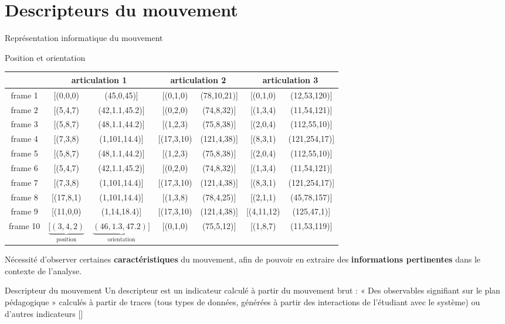 \documentclass[svgnames]{beamer}
\newcommand{\mycite}[1]{[\textit{\cite{#1}}]}
\begin{document}
	\section{Descripteurs du mouvement}
	\begin{frame}{Représentation informatique du mouvement}
		\begin{center}Position et orientation\end{center}
        \begin{table}
			\begin{adjustbox}{max width=\textwidth}
				\begin{tabular}{c|cccccc}
        		& \multicolumn{2}{c}{articulation 1}  & \multicolumn{2}{c}{articulation 2} & \multicolumn{2}{c}{articulation 3}\\\hline
        		frame 1 & [(0,0,0) & (45,0,45)]     & [(0,1,0)  & (78,10,21)]   & [(0,1,0) & (12,53,120)]\\
        		frame 2 & [(5,4,7) & (42,1.1,45.2)] & [(0,2,0)  & (74,8,32)]    & [(1,3,4) & (11,54,121)]\\
        		frame 3 & [(5,8,7) & (48,1.1,44.2)] & [(1,2,3)  & (75,8,38)]    & [(2,0,4) & (112,55,10)]\\
        		frame 4 & [(7,3,8) & (1,101,14.4)]  & [(17,3,10)  & (121,4,38)]    & [(8,3,1) & (121,254,17)]\\
        		frame 5 & [(5,8,7) & (48,1.1,44.2)] & [(1,2,3)  & (75,8,38)]    & [(2,0,4) & (112,55,10)]\\
        		frame 6 & [(5,4,7) & (42,1.1,45.2)] & [(0,2,0)  & (74,8,32)]    & [(1,3,4) & (11,54,121)]\\
        		frame 7 & [(7,3,8) & (1,101,14.4)]  & [(17,3,10)  & (121,4,38)]    & [(8,3,1) & (121,254,17)]\\
        		frame 8 & [(17,8,1) & (1,101,14.4)]  & [(1,3,8)  & (78,4,25)]    & [(2,1,1) & (45,78,157)]\\
        		frame 9 & [(11,0,0) & (1,14,18.4)]  & [(17,3,10)  & (121,4,38)]    & [(4,11,12) & (125,47,1)]\\
        		frame 10 & $\underbrace{[(3,4,2)}_\text{position}$ & $\underbrace{(46,1.3,47.2)]}_\text{orientation}$ & [(0,1,0) & (75,5,12)] & [(1,8,7) & (11,53,119)]\\
        		\end{tabular}
        	\end{adjustbox}
        \end{table}
	\end{frame}
	
	\begin{frame}{\secname}
		Nécessité d'observer certaines \textbf{caractéristiques} du mouvement, afin de pouvoir en extraire des \textbf{informations pertinentes} dans le contexte de l'analyse.
		
		\begin{block}{Descripteur du mouvement}
			Un descripteur est un indicateur calculé à partir du mouvement brut :  « Des observables signifiant sur le plan pédagogique » calculés à partir de traces (tous types de données, générées à partir des interactions de l’étudiant avec le système) ou d’autres indicateurs \mycite{Choquet2007MTf}
		\end{block}
	\end{frame}
	
\end{document}
